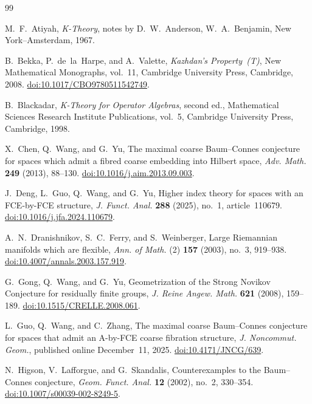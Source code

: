 \begin{thebibliography}{99}

M.~F.~Atiyah,
\emph{K-Theory},
notes by D.~W.~Anderson,
W.~A.~Benjamin, New York--Amsterdam, 1967.

B.~Bekka, P.~de~la~Harpe, and A.~Valette,
\emph{Kazhdan's Property~\textup{(T)}},
New Mathematical Monographs, vol.~11,
Cambridge University Press, Cambridge, 2008.
\href{https://doi.org/10.1017/CBO9780511542749}{doi:10.1017/CBO9780511542749}.

B.~Blackadar,
\emph{K-Theory for Operator Algebras}, second ed.,
Mathematical Sciences Research Institute Publications, vol.~5,
Cambridge University Press, Cambridge, 1998.

X.~Chen, Q.~Wang, and G.~Yu,
The maximal coarse Baum--Connes conjecture for spaces which admit a fibred
coarse embedding into Hilbert space,
\emph{Adv. Math.} \textbf{249} (2013), 88--130.
\href{https://doi.org/10.1016/j.aim.2013.09.003}{doi:10.1016/j.aim.2013.09.003}.

J.~Deng, L.~Guo, Q.~Wang, and G.~Yu,
Higher index theory for spaces with an FCE-by-FCE structure,
\emph{J. Funct. Anal.} \textbf{288} (2025), no.~1, article~110679.
\href{https://doi.org/10.1016/j.jfa.2024.110679}{doi:10.1016/j.jfa.2024.110679}.

A.~N.~Dranishnikov, S.~C.~Ferry, and S.~Weinberger,
Large Riemannian manifolds which are flexible,
\emph{Ann. of Math.} (2) \textbf{157} (2003), no.~3, 919--938.
\href{https://doi.org/10.4007/annals.2003.157.919}{doi:10.4007/annals.2003.157.919}.

G.~Gong, Q.~Wang, and G.~Yu,
Geometrization of the Strong Novikov Conjecture for residually finite groups,
\emph{J. Reine Angew. Math.} \textbf{621} (2008), 159--189.
\href{https://doi.org/10.1515/CRELLE.2008.061}{doi:10.1515/CRELLE.2008.061}.

L.~Guo, Q.~Wang, and C.~Zhang,
The maximal coarse Baum--Connes conjecture for spaces that admit an
A-by-FCE coarse fibration structure,
\emph{J. Noncommut. Geom.}, published online December~11, 2025.
\href{https://doi.org/10.4171/JNCG/639}{doi:10.4171/JNCG/639}.

N.~Higson, V.~Lafforgue, and G.~Skandalis,
Counterexamples to the Baum--Connes conjecture,
\emph{Geom. Funct. Anal.} \textbf{12} (2002), no.~2, 330--354.
\href{https://doi.org/10.1007/s00039-002-8249-5}{doi:10.1007/s00039-002-8249-5}.


\end{thebibliography}
